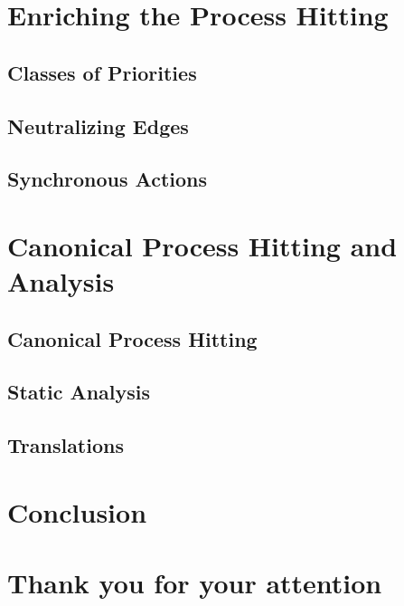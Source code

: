 \documentclass[fleqn,8pt,t]{beamer}
\begin{document}
\section{Enriching the Process Hitting}

\subsection{Classes of Priorities}


\subsection{Neutralizing Edges}


\subsection{Synchronous Actions}



\section{Canonical Process Hitting and Analysis}
\subsection{Canonical Process Hitting}


\subsection{Static Analysis}

\subsection{Translations}




\section{Conclusion}

\section[x]{Thank you for your attention}


\appendix
{}
\setcounter{finalframe}{\value{framenumber}}
\end{document}
